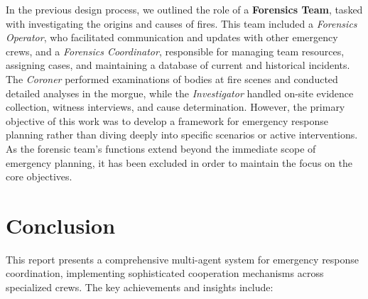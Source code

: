 \documentclass[12pt,a4paper,twocolumn]{article}
\begin{document}
In the previous design process, we outlined the role of a \textbf{Forensics Team}, tasked with investigating the origins and causes 
of fires. This team included a \textit{Forensics Operator}, who facilitated communication and updates with other emergency crews, 
and a \textit{Forensics Coordinator}, responsible for managing team resources, assigning cases, and maintaining a database of current 
and historical incidents. The \textit{Coroner} performed examinations of bodies at fire scenes and conducted detailed analyses in the 
morgue, while the \textit{Investigator} handled on-site evidence collection, witness interviews, and cause determination. However, the 
primary objective of this work was to develop a framework for emergency response planning rather than diving deeply into specific 
scenarios or active interventions. As the forensic team’s functions extend beyond the immediate scope of emergency planning, it 
has been excluded in order to maintain the focus on the core objectives.











\section{Conclusion}
This report presents a comprehensive multi-agent system for emergency response coordination, implementing sophisticated cooperation mechanisms across specialized crews. The key achievements and insights include:
\end{document}
